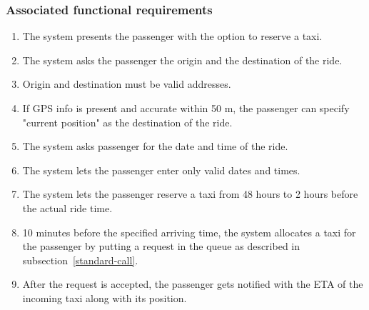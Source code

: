 \subsubsection{Associated functional requirements}
\begin{enumerate}
\item The system presents the passenger with the option to reserve a taxi.
\item The system asks the passenger the origin and the destination of the ride.
\item Origin and destination must be valid addresses.
\item If GPS info is present and accurate within 50 m, the passenger can specify "current position" as the destination of the ride.
\item The system asks passenger for the date and time of the ride.
\item The system lets the passenger enter only valid dates and times.
\item The system lets the passenger reserve a taxi from 48 hours to 2 hours before the actual ride time.
\item 10 minutes before the specified arriving time, the system allocates a taxi for the passenger by putting a request in the queue as described in subsection~\ref{standard-call}.
\item After the request is accepted, the passenger gets notified with the ETA of the incoming taxi along with its position.
\end{enumerate}
